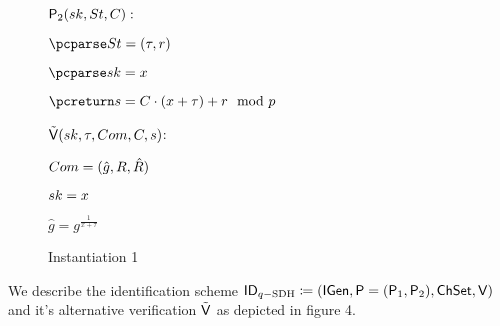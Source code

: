 \begin{figure}[htb!]
{\begin{minipage}[t]{0.5\textwidth}
              \underline{$\mathsf{P}_2(sk,St,C):$}
            \begin{nicodemus}
            	\item $\pcparse \st = (\tau,r)$
		\item $\pcparse \sk = x$
                \item $\pcreturn \s =\c\cdot(x+\tau) + r \mod p$
            \end{nicodemus}
                        \underline{$\tilde{\mathsf{V}}(sk,\tau,Com, C,s)$}:
            \begin{nicodemus}
                \item \pcparse $Com = (\hat{g},R,\hat{R})$
                \item \pcparse $sk = x$
                \item \pcif $\hat{g} = g^{\frac{1}{x+\tau}}$ 
                \item \quad \pcthen {}
                \item \pcelse {}
            \end{nicodemus}
        \end{minipage}
    }
    \caption{Instantiation 1}
    \label{fig:prf-security}
\end{figure}

We describe the identification scheme  $\mathsf{ID}_{q-\text{SDH}} \coloneqq(\mathsf{IGen}, \mathsf{P}=(\mathsf{P}_1,\mathsf{P}_2) ,\mathsf{ChSet}, \mathsf{V})$ and it's alternative verification $\tilde{\mathsf{V}}$ as depicted in figure 4.

